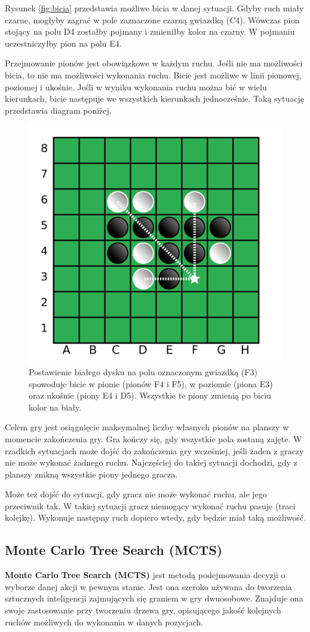 \documentclass[10pt]{article}
\begin{document}
Rysunek \ref{fig:bicia} przedstawia możliwe bicia w danej sytuacji. Gdyby ruch miały czarne, mogłyby zagrać w pole zaznaczone czarną gwiazdką (C4). Wówczas pion stojący na polu D4 zostałby pojmany i zmieniłby kolor na czarny. W pojmaniu uczestniczyłby pion na polu E4.

Przejmowanie pionów jest obowiązkowe w każdym ruchu. Jeśli nie ma możliwości bicia,  to nie ma możliwości wykonania ruchu. Bicie jest możliwe w linii pionowej, poziomej i ukośnie. Jeśli w wyniku wykonania ruchu można bić w wielu kierunkach, bicie następuje we wszystkich kierunkach jednocześnie. Taką sytuację przedstawia diagram poniżej.

\begin{figure}[H]
\centering
\includegraphics[width =0.5\columnwidth]{images/othello2.png}
\caption{Postawienie białego dysku na polu oznaczonym gwiazdką (F3) spowoduje bicie w pionie (pionów F4 i F5), w poziomie (piona E3) oraz ukośnie (piony E4 i D5). Wszystkie te piony zmienią po biciu kolor na biały.}
\end{figure}

Celem gry jest osiągnięcie maksymalnej liczby własnych pionów na planszy w momencie zakończenia gry. Gra kończy się, gdy wszystkie pola zostaną zajęte. W rzadkich sytuacjach może dojść do zakończenia gry wcześniej, jeśli żaden z graczy nie może wykonać żadnego ruchu. Najczęściej do takiej sytuacji dochodzi, gdy z planszy znikną wszystkie piony jednego gracza.

Może też dojść do sytuacji, gdy gracz nie może wykonać ruchu, ale jego przeciwnik tak. W takiej sytuacji gracz niemogący wykonać ruchu pasuje (traci kolejkę). Wykonuje następny ruch dopiero wtedy, gdy będzie miał taką możliwość.

\subsection{Monte Carlo Tree Search (MCTS)}
\label{sec:mcts}
\textbf{Monte Carlo Tree Search (MCTS)} jest metodą podejmowania decyzji o wyborze danej akcji w pewnym stanie. Jest ona szeroko używana do tworzenia sztucznych inteligencji zajmujących się graniem w gry dwuosobowe. Znajduje ona swoje zastosowanie przy tworzeniu drzewa gry, opisującego jakość kolejnych ruchów możliwych do wykonania w danych pozycjach.
\end{document}
